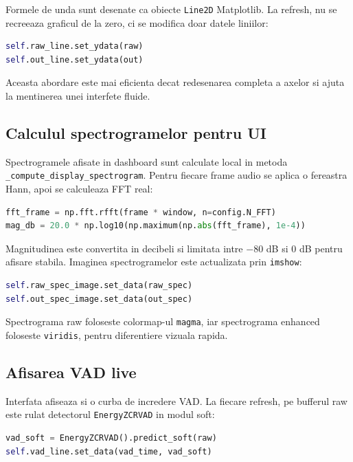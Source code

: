 \documentclass[12pt,a4paper]{article}
\begin{document}
Formele de unda sunt desenate ca obiecte \texttt{Line2D} Matplotlib. La refresh,
nu se recreeaza graficul de la zero, ci se modifica doar datele liniilor:

\begin{lstlisting}[language=Python]
self.raw_line.set_ydata(raw)
self.out_line.set_ydata(out)
\end{lstlisting}

Aceasta abordare este mai eficienta decat redesenarea completa a axelor si ajuta
la mentinerea unei interfete fluide.

\subsection{Calculul spectrogramelor pentru UI}

Spectrogramele afisate in dashboard sunt calculate local in metoda
\texttt{\_compute\_display\_spectrogram}. Pentru fiecare frame audio se aplica o
fereastra Hann, apoi se calculeaza FFT real:

\begin{lstlisting}[language=Python]
fft_frame = np.fft.rfft(frame * window, n=config.N_FFT)
mag_db = 20.0 * np.log10(np.maximum(np.abs(fft_frame), 1e-4))
\end{lstlisting}

Magnitudinea este convertita in decibeli si limitata intre \(-80\) dB si \(0\) dB
pentru afisare stabila. Imaginea spectrogramelor este actualizata prin
\texttt{imshow}:

\begin{lstlisting}[language=Python]
self.raw_spec_image.set_data(raw_spec)
self.out_spec_image.set_data(out_spec)
\end{lstlisting}

Spectrograma raw foloseste colormap-ul \texttt{magma}, iar spectrograma enhanced
foloseste \texttt{viridis}, pentru diferentiere vizuala rapida.

\subsection{Afisarea VAD live}

Interfata afiseaza si o curba de incredere VAD. La fiecare refresh, pe bufferul
raw este rulat detectorul \texttt{EnergyZCRVAD} in modul soft:

\begin{lstlisting}[language=Python]
vad_soft = EnergyZCRVAD().predict_soft(raw)
self.vad_line.set_data(vad_time, vad_soft)
\end{lstlisting}
\end{document}
